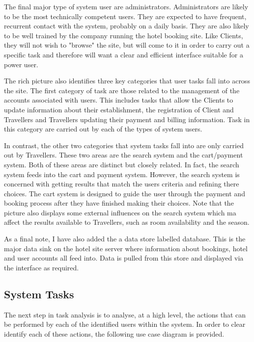 \documentclass{article}
\begin{document}
The final major type of system user are administrators. Administrators are likely to be the most technically competent users. They are expected to have frequent, recurrent contact with the system, probably on a daily basis. They are also likely to be well trained by the company running the hotel booking site. Like Clients, they will not wish to "browse" the site, but will come to it in order to carry out a specific task and therefore will want a clear and efficient interface suitable for a power user.

The rich picture also identifies three key categories that user tasks fall into across the site. The first category of task are those related to the management of the accounts associated with users. This includes tasks that allow the Clients to update information about their establishment, the registration of Client and Travellers and Travellers updating their payment and billing information. Task in this category are carried out by each of the types of system users.

In contrast, the other two categories that system tasks fall into are only carried out by Travellers. These two areas are the search system and the cart/payment system. Both of these areas are distinct but closely related. In fact, the search system feeds into the cart and payment system. However, the search system is concerned with getting results that match the users criteria and refining there choices. The cart system is designed to guide the user through the payment and booking process after they have finished making their choices. Note that the picture also displays some external influences on the search system which ma affect the results available to Travellers, such as room availability and the season.

As a final note, I have also added the a data store labelled database. This is the major data sink on the hotel site server where information about bookings, hotel and user accounts all feed into. Data is pulled from this store and displayed via the interface as required.

\subsection{System Tasks}
The next step in task analysis is to analyse, at a high level, the actions that can be performed by each of the identified users within the system. In order to clear identify each of these actions, the following use case diagram is provided.
\end{document}
